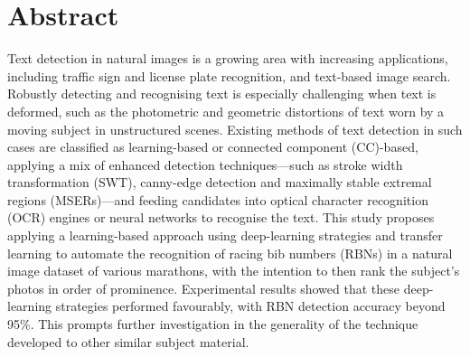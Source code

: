 \chapter*{Abstract}

Text detection in natural images is a growing area with increasing applications, including traffic sign and license plate recognition, and text-based image search.
Robustly detecting and recognising text is especially challenging when text is deformed, such as the photometric and geometric distortions of text worn by a moving subject in unstructured scenes.
Existing methods of text detection in such cases are classified as learning-based or connected component (CC)-based, applying a mix of enhanced detection techniques---such as stroke width transformation (SWT), canny-edge detection and maximally stable extremal regions (MSERs)---and feeding candidates into optical character recognition (OCR) engines or neural networks to recognise the text.
This study proposes applying a learning-based approach using deep-learning strategies and transfer learning to automate the recognition of racing bib numbers (RBNs) in a natural image dataset of various marathons, with the intention to then rank the subject's photos in order of prominence.
Experimental results showed that these deep-learning strategies performed favourably, with RBN detection accuracy beyond 95\%. This prompts further investigation in the generality of the technique developed to other similar subject material.
